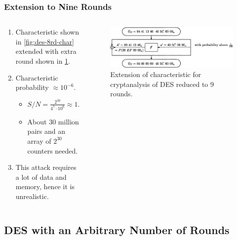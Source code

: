 \documentclass{beamer}
\begin{document}
    \begin{frame}
        \frametitle{Extension to Nine Rounds}
        \begin{columns}
            \begin{column}{0.6\linewidth}
                \begin{enumerate}
                    \item<1-> Characteristic shown in \cref{fig:des-8rd-char}
                    extended with extra round shown in \cref{fig:des-9rd-char}.
                    \item<2-> Characteristic probability \(\approx 10^{-6}\).
                    \begin{itemize}
                        \item \(S/N = \frac{2^{30}}{4^5 \cdot 10^6} \approx 1\).
                        \item About 30 million pairs and an array of \(2^{30}\)
                        counters needed.
                    \end{itemize}
                    \item<3-> This attack requires a lot of data and memory,
                    hence it is unrealistic.
                \end{enumerate} 
            \end{column}
            \begin{column}{0.4\linewidth}
                \begin{figure}[!ht]
                    \centering
                    \includegraphics[width=\columnwidth]{images/des_9round_char.png}
                    \caption{Extension of characteristic for cryptanalysis of DES reduced to 9 rounds.}
                    \label{fig:des-9rd-char}
                \end{figure}
            \end{column}
        \end{columns}
    \end{frame}

    \subsection{DES with an Arbitrary Number of Rounds}
    \label{subsec:des-arbit}
\end{document}

